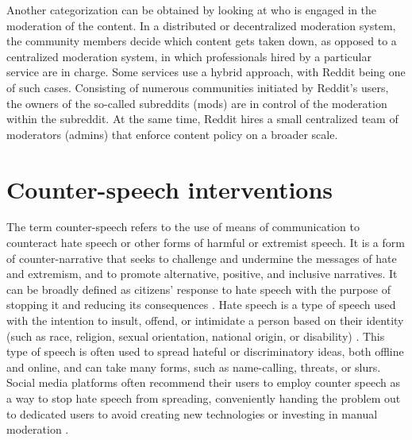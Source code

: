 \documentclass[preprint,12pt]{elsarticle}
\begin{document}
Another categorization can be obtained by looking at who is engaged in the moderation of the content. In a distributed or decentralized moderation system, the community members decide which content gets taken down, as opposed to a centralized moderation system, in which professionals hired by a particular service are in charge. Some services use a hybrid approach, with Reddit being one of such cases. Consisting of numerous communities initiated by Reddit's users, the owners of the so-called subreddits (mods) are in control of the moderation within the subreddit. At the same time, Reddit hires a small centralized team of moderators (admins) that enforce content policy on a broader scale. 






























\section{Counter-speech interventions}\label{sec:counter-speech}

The term counter-speech refers to the use of means of communication to counteract hate speech or other forms of harmful or extremist speech. It is a form of counter-narrative that seeks to challenge and undermine the messages of hate and extremism, and to promote alternative, positive, and inclusive narratives. It can be broadly defined as citizens’ response to hate speech with the purpose of stopping it and reducing its consequences \citep{leader2016dangerous, garland2020countering}. Hate speech is a type of speech used with the intention to insult, offend, or intimidate a person based on their identity (such as race, religion, sexual orientation, national origin, or disability) \citep{dictionary2002merriam}. This type of speech is often used to spread hateful or discriminatory ideas, both offline and online, and can take many forms, such as name-calling, threats, or slurs. Social media platforms often recommend their users to employ counter speech as a way to stop hate speech from spreading, conveniently handing the problem out to dedicated users to avoid creating new technologies or investing in manual moderation \citep{schieb2016governing}. 
\end{document}
